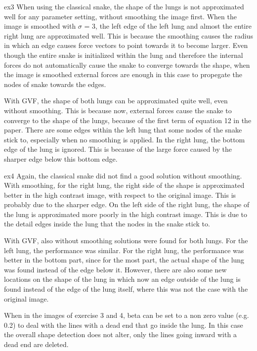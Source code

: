 ex3
When using the classical snake, the shape of the lungs is not approximated well for any parameter setting, without smoothing the image first. When the image is smoothed with $\sigma$ = 3, the left edge of the left lung and almost the entire right lung are approximated well. This is because the smoothing causes the radius in which an edge causes force vectors to point towards it to become larger. Even though the entire snake is initialized within the lung and therefore the internal forces do not automatically cause the snake to converge towards the shape, when the image is smoothed external forces are enough in this case to propegate the nodes of snake towards the edges.

With GVF, the shape of both lungs can be approximated quite well, even without smoothing. This is because now, external forces cause the snake to converge to the shape of the lungs, because of the first term of equation 12 in the paper. There are some edges within the left lung that some nodes of the snake stick to, especially when no smoothing is applied. In the right lung, the bottom edge of the lung is ignored. This is because of the large force caused by the sharper edge below this bottom edge.


ex4
Again, the classical snake did not find a good solution without smoothing. With smoothing, for the right lung, the right side of the shape is approximated better in the high contrast image, with respect to the original image. This is probably due to the sharper edge. On the left side of the right lung, the shape of the lung is approximated more poorly in the high contrast image. This is due to the detail edges inside the lung that the nodes in the snake stick to.

With GVF, also without smoothing solutions were found for both lungs. For the left lung, the performance was similar. For the right lung, the performance was better in the bottom part, since for the most part, the actual shape of the lung was found instead of the edge below it. However, there are also some new locations on the shape of the lung in which now an edge outside of the lung is found instead of the edge of the lung itself, where this was not the case with the original image.

When in the images of exercise 3 and 4, beta can be set to a non zero value (e.g. 0.2) to deal with the lines with a dead end that go inside the lung. In this case the overall shape detection does not alter, only the lines going inward with a dead end are deleted.